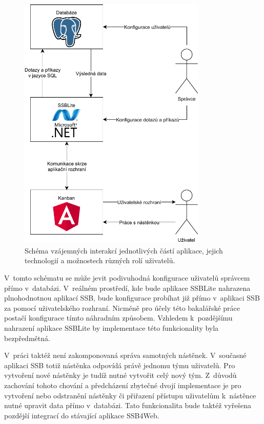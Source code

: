 \begin{figure}[H]
    \label{img:scheme}
	\centering
	\includegraphics[width=0.8\textwidth]{obrazky-figures/app-scheme.pdf}
	\caption{Schéma vzájemných interakcí jednotlivých částí aplikace, jejich technologií a možnostech různých rolí uživatelů.}
\end{figure}

V~tomto schématu se může jevit podivuhodná konfigurace uživatelů správcem přímo v~databázi. V~reálném prostředí, kde bude aplikace SSBLite nahrazena plnohodnotnou aplikací SSB, bude konfigurace probíhat již přímo v~aplikaci SSB za pomocí uživatelského rozhraní. Nicméně pro účely této bakalářské práce postačí konfigurace tímto náhradním způsobem. Vzhledem k~pozdějšímu nahrazení aplikace SSBLite by implementace této funkcionality byla bezpředmětná.

V~práci taktéž není zakomponovaná správa samotných nástěnek. V~současné aplikaci SSB totiž nástěnka odpovídá právě jednomu týmu uživatelů. Pro vytvoření nové nástěnky je tudíž nutné vytvořit celý nový tým. Z~důvodů zachování tohoto chování a předcházení zbytečné dvojí implementace je pro vytvoření nebo odstranění nástěnky či přiřazení přístupu uživatelům k~nástěnce nutné upravit data přímo v~databázi. Tato funkcionalita bude taktéž vyřešena pozdější integrací do stávající aplikace SSB4Web.

